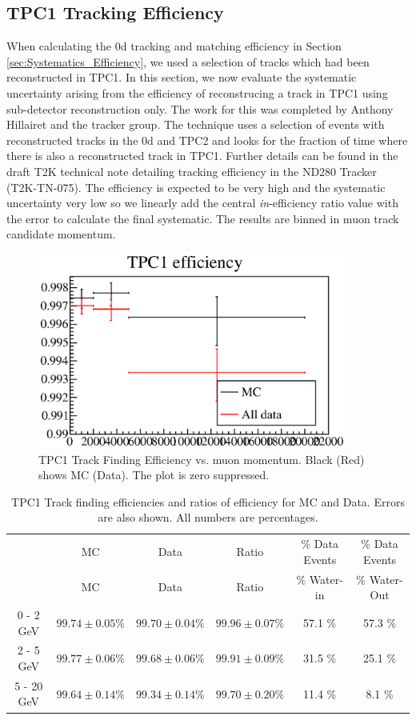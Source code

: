 \subsection{TPC1 Tracking Efficiency}
\label{sec:Systematics_TPC1tracking}

When calculating the \p0d tracking and matching efficiency in Section \ref{sec:Systematics_Efficiency}, we used a selection of tracks which had been reconstructed in TPC1. In this section, we now evaluate the systematic uncertainty arising from the efficiency of reconstrucing a track in TPC1 using sub-detector reconstruction only. 
The work for this was completed by Anthony Hillairet and the tracker group. The technique uses a selection of events with reconstructed tracks in the \p0d and TPC2 and looks for the fraction of time where there is also a reconstructed track in TPC1. Further details can be found in the draft T2K technical note detailing tracking efficiency in the ND280 Tracker (T2K-TN-075). The efficiency is expected to be very high and the systematic uncertainty very low so we linearly add the central \textit{in}-efficiency ratio value with the error to calculate the final systematic. The results are binned in muon track candidate momentum.%

\begin{figure}[here]
\centering
\includegraphics[width=4in]{Figures/TrkFdEf_TPC1_RajsBins.eps}
\caption{TPC1 Track Finding Efficiency vs. muon momentum. Black (Red) shows MC (Data). The plot is zero suppressed.}
\label{fig:tpc1eff}
\end{figure}

\begin{table}[here]
\caption{TPC1 Track finding efficiencies and ratios of efficiency for MC and Data. Errors are also shown. All numbers are percentages.}
\label{tab:tpc1eff}
\centering
\begin{tabular}{cccccc}\toprule
& MC & Data & Ratio & \% Data Events& \% Data Events \\
& MC & Data & Ratio & \% Water-in & \% Water-Out \\ \midrule
0 - 2 GeV & $99.74 \pm 0.05 \%$ & $99.70 \pm 0.04 \%$ & $99.96 \pm 0.07 \%$ & 57.1 \% & 57.3 \% \\
2 - 5 GeV & $99.77 \pm 0.06 \%$ & $99.68 \pm 0.06 \%$ & $99.91 \pm 0.09 \%$ & 31.5 \% & 25.1 \% \\
5 - 20 GeV & $99.64 \pm 0.14 \%$ & $99.34 \pm 0.14 \%$ & $99.70 \pm 0.20 \%$ & 11.4 \% & 8.1 \%\\
\bottomrule
\end{tabular}
\end{table}


